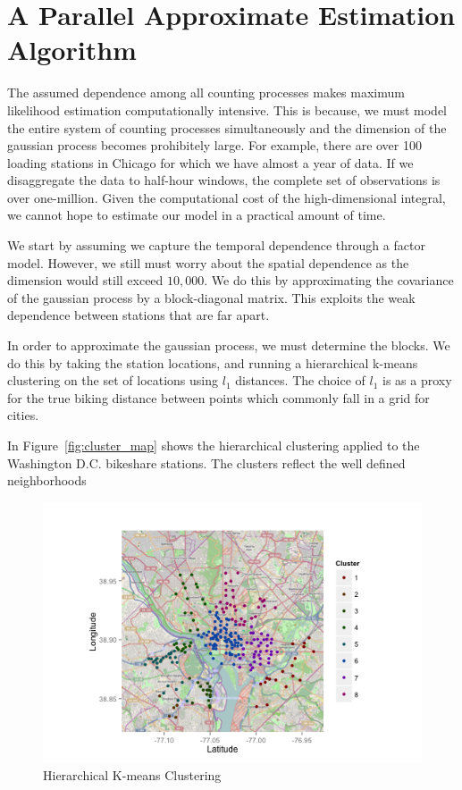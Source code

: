 \documentclass{acm_proc_article-sp}
\begin{document}
\section{A Parallel Approximate Estimation Algorithm}

The assumed dependence among all counting processes makes maximum likelihood estimation computationally intensive.  This is because, we must model the entire system of counting processes simultaneously and the dimension of the gaussian process becomes prohibitely large.  For example, there are over 100 loading stations in Chicago for which we have almost a year of data.  If we disaggregate the data to half-hour windows, the complete set of observations is over one-million.  Given the computational cost of the high-dimensional integral, we cannot hope to estimate our model in a practical amount of time.

We start by assuming we capture the temporal dependence through a factor model.  However, we still must worry about the spatial dependence as the dimension would still exceed $10,000$.   We do this by approximating the covariance of the gaussian process by a block-diagonal matrix. This exploits the weak dependence between stations that are far apart.  

In order to approximate the gaussian process, we must determine the blocks.  We do this by taking the station locations, and running a hierarchical k-means clustering on the set of locations using $l_1$ distances.  The choice of $l_1$ is as a proxy for the true biking distance between points which commonly fall in a grid for cities.

In Figure~\ref{fig:cluster_map} shows the hierarchical clustering applied to the Washington D.C. bikeshare stations.  The clusters reflect the well defined neighborhoods 

\begin{figure} [!h]
\caption{Hierarchical K-means Clustering}
\centering
\includegraphics[scale = 0.2]{cluster_map.png}
\end{figure}
\end{document}
